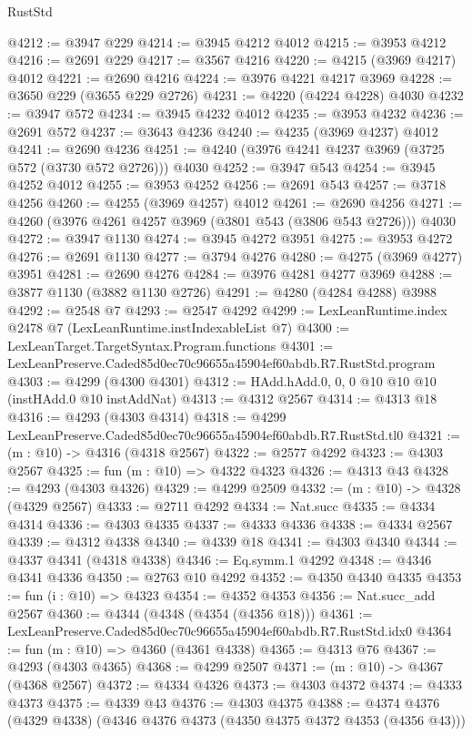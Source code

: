 \begin{lexlean}{RustStd}
\begin{coremodule}
@4212 := @3947 @229
@4214 := @3945 @4212 @4012
@4215 := @3953 @4212
@4216 := @2691 @229
@4217 := @3567 @4216
@4220 := @4215 (@3969 @4217) @4012
@4221 := @2690 @4216
@4224 := @3976 @4221 @4217 @3969
@4228 := @3650 @229 (@3655 @229 @2726)
@4231 := @4220 (@4224 @4228) @4030
@4232 := @3947 @572
@4234 := @3945 @4232 @4012
@4235 := @3953 @4232
@4236 := @2691 @572
@4237 := @3643 @4236
@4240 := @4235 (@3969 @4237) @4012
@4241 := @2690 @4236
@4251 := @4240 (@3976 @4241 @4237 @3969 (@3725 @572 (@3730 @572 @2726))) @4030
@4252 := @3947 @543
@4254 := @3945 @4252 @4012
@4255 := @3953 @4252
@4256 := @2691 @543
@4257 := @3718 @4256
@4260 := @4255 (@3969 @4257) @4012
@4261 := @2690 @4256
@4271 := @4260 (@3976 @4261 @4257 @3969 (@3801 @543 (@3806 @543 @2726))) @4030
@4272 := @3947 @1130
@4274 := @3945 @4272 @3951
@4275 := @3953 @4272
@4276 := @2691 @1130
@4277 := @3794 @4276
@4280 := @4275 (@3969 @4277) @3951
@4281 := @2690 @4276
@4284 := @3976 @4281 @4277 @3969
@4288 := @3877 @1130 (@3882 @1130 @2726)
@4291 := @4280 (@4284 @4288) @3988
@4292 := @2548 @7
@4293 := @2547 @4292
@4299 := LexLeanRuntime.index @2478 @7 (LexLeanRuntime.instIndexableList @7)
@4300 := LexLeanTarget.TargetSyntax.Program.functions
@4301 := LexLeanPreserve.Caded85d0ec70c96655a45904ef60abdb.R7.RustStd.program
@4303 := @4299 (@4300 @4301)
@4312 := HAdd.hAdd.{0, 0, 0} @10 @10 @10 (instHAdd.{0} @10 instAddNat)
@4313 := @4312 @2567
@4314 := @4313 @18
@4316 := @4293 (@4303 @4314)
@4318 := @4299 LexLeanPreserve.Caded85d0ec70c96655a45904ef60abdb.R7.RustStd.tl0
@4321 := (m : @10) -> @4316 (@4318 @2567)
@4322 := @2577 @4292
@4323 := @4303 @2567
@4325 := fun (m : @10) => @4322 @4323
@4326 := @4313 @43
@4328 := @4293 (@4303 @4326)
@4329 := @4299 @2509
@4332 := (m : @10) -> @4328 (@4329 @2567)
@4333 := @2711 @4292
@4334 := Nat.succ
@4335 := @4334 @4314
@4336 := @4303 @4335
@4337 := @4333 @4336
@4338 := @4334 @2567
@4339 := @4312 @4338
@4340 := @4339 @18
@4341 := @4303 @4340
@4344 := @4337 @4341 (@4318 @4338)
@4346 := Eq.symm.{1} @4292
@4348 := @4346 @4341 @4336
@4350 := @2763 @10 @4292
@4352 := @4350 @4340 @4335
@4353 := fun (i : @10) => @4323
@4354 := @4352 @4353
@4356 := Nat.succ_add @2567
@4360 := @4344 (@4348 (@4354 (@4356 @18)))
@4361 := LexLeanPreserve.Caded85d0ec70c96655a45904ef60abdb.R7.RustStd.idx0
@4364 := fun (m : @10) => @4360 (@4361 @4338)
@4365 := @4313 @76
@4367 := @4293 (@4303 @4365)
@4368 := @4299 @2507
@4371 := (m : @10) -> @4367 (@4368 @2567)
@4372 := @4334 @4326
@4373 := @4303 @4372
@4374 := @4333 @4373
@4375 := @4339 @43
@4376 := @4303 @4375
@4388 := @4374 @4376 (@4329 @4338) (@4346 @4376 @4373 (@4350 @4375 @4372 @4353 (@4356 @43)))

\end{coremodule}
\end{lexlean}
